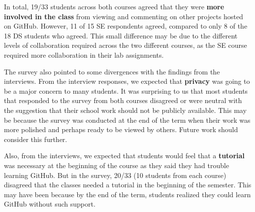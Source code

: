 In total, 19/33 students across both courses agreed that they were \textbf{more involved in the class} from viewing and commenting on other projects hosted on GitHub.
However, 11 of 15 SE respondents agreed, compared to only 8 of the 18 DS students who agreed.
This small difference may be due to the different levels of collaboration required across the two different courses, as the SE course required more collaboration in their lab assignments.

The survey also pointed to some divergences with the findings from the interviews.
From the interview responses, we expected that \textbf{privacy} was going to be a major concern to many students.
It was surprising to us that most students that responded to the survey from both courses disagreed or were neutral with the suggestion that their school work should not be publicly available.  This may be because the survey was conducted at the end of the term when their work was more polished and perhaps ready to be viewed by others.  Future work should consider this further.

Also, from the interviews, we expected that students would feel that a \textbf{tutorial} was necessary at the beginning of the course as they said they had trouble learning GitHub.  But in the survey, 20/33 (10 students from each course) disagreed that the classes needed a tutorial in the beginning of the semester.  This may have been because by the end of the term, students realized they could learn GitHub without such support.












